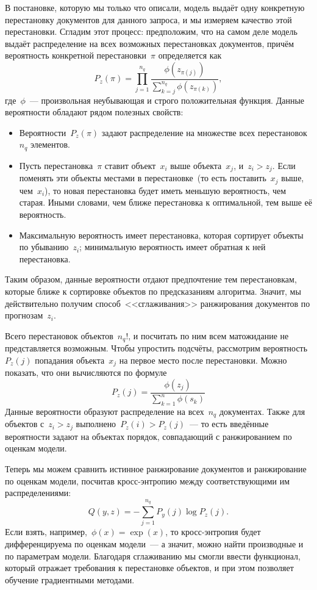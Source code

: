 \documentclass[12pt,fleqn]{article}
\begin{document}
В постановке, которую мы только что описали, модель выдаёт одну конкретную перестановку документов для данного
запроса, и мы измеряем качество этой перестановки.
Сгладим этот процесс: предположим, что на самом деле модель выдаёт распределение на всех возможных перестановках
документов, причём вероятность конкретной перестановки~$\pi$ определяется как
\[
    P_z(\pi)
    =
    \prod_{j = 1}^{n_q}
        \frac{
            \phi(z_{\pi(j)})
        }{
            \sum_{k = j}^{n_q}
                \phi(z_{\pi(k)})
        },
\]
где~$\phi$~--- произвольная неубывающая и строго положительная функция.
Данные вероятности обладают рядом полезных свойств:
\begin{itemize}
    \item Вероятности~$P_z(\pi)$ задают распределение на множестве всех перестановок~$n_q$ элементов.
    \item Пусть перестановка~$\pi$ ставит объект~$x_i$ выше объекта~$x_j$,
        и~$z_i > z_j$.
        Если поменять эти объекты местами в перестановке~(то есть поставить~$x_j$ выше, чем~$x_i$),
        то новая перестановка будет иметь меньшую вероятность, чем старая.
        Иными словами, чем ближе перестановка к оптимальной, тем выше её вероятность.
    \item Максимальную вероятность имеет перестановка, которая сортирует объекты по убыванию~$z_i$;
        минимальную вероятность имеет обратная к ней перестановка.
\end{itemize}

Таким образом, данные вероятности отдают предпочтение тем перестановкам, которые ближе
к сортировке объектов по предсказаниям алгоритма.
Значит, мы действительно получим способ~<<сглаживания>> ранжирования документов по прогнозам~$z_i$.

Всего перестановок объектов~$n_q!$, и посчитать по ним всем матожидание не представляется возможным.
Чтобы упростить подсчёты, рассмотрим вероятность~$P_z(j)$ попадания объекта~$x_j$ на первое место
после перестановки.
Можно показать, что они вычисляются по формуле
\[
    P_z(j)
    =
    \frac{
        \phi(z_j)
    }{
        \sum_{k = 1}^{n}
            \phi(s_k)
    }
\]
Данные вероятности образуют распределение на всех~$n_q$ документах.
Также для объектов с~$z_i > z_j$ выполнено~$P_z(i) > P_z(j)$~---
то есть введённые вероятности задают на объектах порядок, совпадающий
с ранжированием по оценкам модели.

Теперь мы можем сравнить истинное ранжирование документов и ранжирование по оценкам модели,
посчитав кросс-энтропию между соответствующими им распределениями:
\[
    Q(y, z)
    =
    -
    \sum_{j = 1}^{n_q}
        P_y(j)
        \log P_z(j).
\]
Если взять, например,~$\phi(x) = \exp(x)$,
то кросс-энтропия будет дифференцируема по оценкам модели~---
а значит, можно найти производные и по параметрам модели.
Благодаря сглаживанию мы смогли ввести функционал, который отражает
требования к перестановке объектов,
и при этом позволяет обучение градиентными методами.



\end{document}
